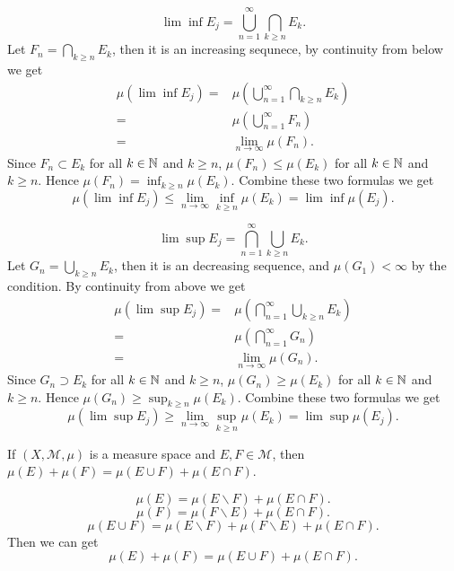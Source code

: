\begin{sol}
  \[
 \lim\inf E_{j}=\bigcup_{n=1} ^{\infty}\bigcap_{k\ge n} E_{k}
  .\] 
  Let $F_n=\bigcap_{k\ge n} E_k$, then it is an increasing sequnece, by continuity from below we get
  \begin{align*}
    \mu\left( \lim\inf E_j \right) =& \mu\left( \bigcup_{n=1} ^{\infty}\bigcap_{k\ge n} E_k \right) \\
    =&\mu\left( \bigcup_{n=1} ^{\infty}F_n \right) \\
    =& \lim_{n\to \infty}\mu\left( F_n \right)
  .\end{align*}
  Since $F_n\subset E_{k}$ for all $k\in \mathbb{N}$ and $k\ge n$, $\mu\left( F_n \right) \le \mu\left( E_k \right) $ for all $k\in\mathbb{N}$ and $k\ge n$. Hence $\mu\left( F_n \right) =\inf_{k\ge n}\mu\left( E_k \right) $. Combine these two formulas we get
  \[
    \mu\left( \lim\inf E_j \right) \le \lim _{n\to \infty}\inf_{k\ge n}\mu\left( E_k \right) =\lim\inf \mu\left( E_j \right) 
  .\]

  \[
  \lim\sup E_j=\bigcap_{n=1} ^{\infty}\bigcup_{k\ge n} E_k
  .\] 
  Let $G_n=\bigcup_{k\ge n} E_k$, then it is an decreasing sequence, and $\mu\left( G_1 \right)<\infty $ by the condition. By continuity from above we get
  \begin{align*}
    \mu\left( \lim\sup E_j \right) =& \mu\left( \bigcap_{n=1} ^{\infty}\bigcup_{k\ge n} E_k \right) \\
    =&\mu\left( \bigcap_{n=1} ^{\infty}G_n \right) \\
    =&\lim_{n\to \infty}\mu\left( G_n \right) 
  .\end{align*}
  Since $G_n\supset E_{k} $ for all $k\in \mathbb{N}$ and $k\ge n$, $\mu\left( G_n \right) \ge \mu\left( E_k \right) $ for all $k\in \mathbb{N}$ and $k\ge n$. Hence $\mu\left( G_n \right) \ge \sup_{k\ge n}\mu\left( E_k \right) $. Combine these two formulas we get
  \[
    \mu\left( \lim\sup E_j \right) \ge \lim_{n\to \infty}\sup_{k\ge n}\mu\left( E_k \right) =\lim\sup\mu\left( E_j \right) 
  .\] 
\end{sol}
\begin{exe}
  If $(X,\mathcal{M},\mu)$ is a measure space and $E,F\in \mathcal{M}$, then $\mu(E)+\mu(F)=\mu(E\cup F)+\mu(E\cap F)$.
\end{exe}
\begin{sol}
  \[
    \mu\left( E \right) =\mu\left( E\backslash F \right) +\mu\left( E\cap F \right) 
  .\] 
  \[
    \mu\left( F \right) =\mu\left( F\backslash E \right) +\mu\left( E\cap F \right) 
  .\] 
  \[
    \mu\left( E\cup F \right) =\mu\left( E\backslash F \right) +\mu\left( F\backslash E \right) +\mu\left( E\cap F \right) 
  .\]
  Then we can get 
  \[
    \mu\left( E \right) +\mu\left( F \right) =\mu\left( E\cup F \right) +\mu\left( E\cap F \right) 
  .\] 
\end{sol}

